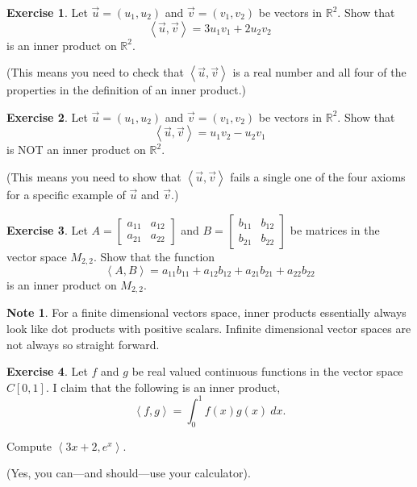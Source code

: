 \documentclass{beamer}
\newcommand{\R}{\mathbb{R}}
\newcommand{\fn}{\insertframenumber}
\newcommand{\ip}[2]{\left\langle #1,#2\right\rangle}
\theoremstyle{definition}
\newtheorem{exercise}{Exercise}
\newtheorem*{nb}{Note}
\begin{document}
\begin{frame}{\fn}
	\begin{exercise}
		Let $\vec u=(u_1,u_2)$ and $\vec v=(v_1,v_2)$ be vectors in $\R^2$.  Show that
			\[\ip{\vec u}{\vec v}=3u_1v_1+2u_2v_2\]
		is an inner product on $\R^2$.  
		
		(This means you need to check that $\ip{\vec u}{\vec v}$ is a real number and all four of the properties in the definition of an inner product.)
	\end{exercise}
	\begin{exercise}
		Let $\vec u=(u_1,u_2)$ and $\vec v=(v_1,v_2)$ be vectors in $\R^2$.  Show that
		\[\ip{\vec u}{\vec v}=u_1v_2-u_2v_1\]
		is NOT an inner product on $\R^2$.  
		
		(This means you need to show that $\ip{\vec u}{\vec v}$ fails a single one of the four axioms for a specific example of $\vec u$ and $\vec v$.)
	\end{exercise}
\end{frame}
\begin{frame}{\fn}
	\begin{exercise}\label{MatInnerProd}
		Let $A=\begin{bmatrix} a_{11}&a_{12}\\a_{21}&a_{22}\end{bmatrix}$ and $B=\begin{bmatrix}b_{11}&b_{12}\\b_{21}&b_{22}\end{bmatrix}$ be matrices in the vector space $M_{2,2}$.  Show that the function
			\[\ip{A}{B}=a_{11}b_{11}+a_{12}b_{12}+a_{21}b_{21}+a_{22}b_{22}\]
		is an inner product on $M_{2,2}$.
	\end{exercise}
	\begin{nb}
		For a finite dimensional vectors space, inner products essentially always look like dot products with positive scalars.  Infinite dimensional vector spaces are not always so straight forward.
	\end{nb}
\end{frame}
\begin{frame}{\fn}
	\begin{exercise}
		Let $f$ and $g$ be real valued continuous functions in the vector space $C[0,1]$.  I claim that the following is an inner product,\[\ip{f}{g}=\int_0^1 f(x)g(x)\ dx.\]
		
		Compute $\ip{3x+2}{e^x}$. 
		
		(Yes, you can---and should---use your calculator).
	\end{exercise}
\end{frame}
\end{document}
